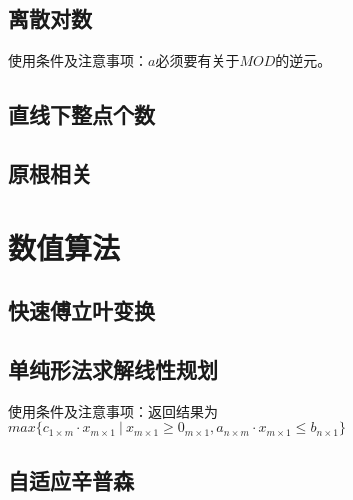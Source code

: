 \documentclass[landscape, oneside, a4paper, cs4size]{book}
\begin{document}
\begin{multicols}{2}
			\section{离散对数}
			\begin{spacing}{0.8}
				使用条件及注意事项：$a$必须要有关于$MOD$的逆元。
				
			\end{spacing}
			\section{直线下整点个数}
			\begin{spacing}{0.8}
				
			\end{spacing}
			\section{原根相关}
			\begin{spacing}{0.8}
				
			\end{spacing}
		\chapter{数值算法}
			\section{快速傅立叶变换}
			\begin{spacing}{0.8}
				
			\end{spacing}
			\section{单纯形法求解线性规划}
			\begin{spacing}{0.8}
				使用条件及注意事项：返回结果为$max\{c_{1 \times m} \cdot x_{m \times 1} \ | \ x_{m \times 1} \geq 0_{m \times 1}, a_{n \times m} \cdot x_{m \times 1} \leq b_{n \times 1}\}$
				
			\end{spacing}
			\section{自适应辛普森}
			\begin{spacing}{0.8}
				
			\end{spacing}

\end{multicols}
\end{document}
